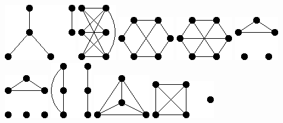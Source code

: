 \documentclass[11pt,paper=b5,footinclude,headinclude]{scrbook} %
\begin{document}
{\includegraphics[scale=0.5,frame]{smallGraphs/g_K2Uclaw.png}     
\includegraphics[scale=0.5,frame]{smallGraphs/g_K33+e.png}     
\includegraphics[scale=0.5,frame]{smallGraphs/g_K33-e.png}     
\includegraphics[scale=0.5,frame]{smallGraphs/g_K33.png}     
\includegraphics[scale=0.5,frame]{smallGraphs/g_K3U2K1.png}     
\includegraphics[scale=0.5,frame]{smallGraphs/g_K3U3K1.png}     
\includegraphics[scale=0.5,frame]{smallGraphs/g_K3UP3.png}     
\includegraphics[scale=0.5,frame]{smallGraphs/g_K4.png}     
\includegraphics[scale=0.5,frame]{smallGraphs/g_K4UK1.png}     
}
\end{document}
